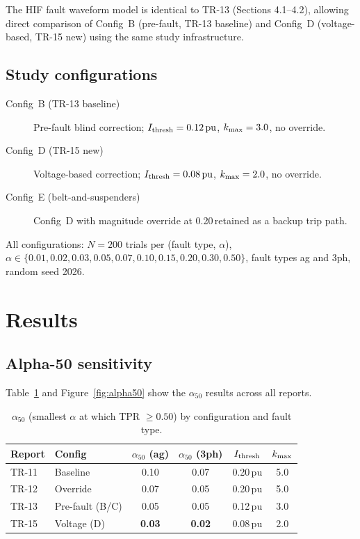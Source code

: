 \documentclass[11pt,a4paper]{article}
\newcommand{\alphafifty}{\alpha_{50}}
\newcommand{\pu}{\,\text{pu}}
\begin{document}
The HIF fault waveform model is identical to TR-13 (Sections 4.1--4.2),
allowing direct comparison of Config~B (pre-fault, TR-13 baseline) and
Config~D (voltage-based, TR-15 new) using the same study infrastructure.

\subsection{Study configurations}

\begin{description}
  \item[Config~B (TR-13 baseline)] Pre-fault blind correction;
        $I_{\rm thresh} = 0.12\pu$, $k_{\rm max} = 3.0$, no override.

  \item[Config~D (TR-15 new)] Voltage-based correction;
        $I_{\rm thresh} = 0.08\pu$, $k_{\rm max} = 2.0$, no override.

  \item[Config~E (belt-and-suspenders)] Config~D with magnitude override
        at 0.20\pu retained as a backup trip path.
\end{description}

All configurations: $N = 200$ trials per (fault type, $\alpha$),
$\alpha \in \{0.01, 0.02, 0.03, 0.05, 0.07, 0.10, 0.15, 0.20, 0.30, 0.50\}$,
fault types ag and 3ph, random seed 2026.

\section{Results}
\label{sec:results}

\subsection{Alpha-50 sensitivity}

Table~\ref{tab:alpha50} and Figure~\ref{fig:alpha50} show the
$\alphafifty$ results across all reports.

\begin{table}[h]
  \centering
  \caption{$\alphafifty$ (smallest $\alpha$ at which TPR $\geq 0.50$) by
           configuration and fault type.}
  \label{tab:alpha50}
  \begin{tabular}{llcccc}
    \toprule
    Report & Config & $\alphafifty$ (ag) & $\alphafifty$ (3ph)
           & $I_{\rm thresh}$ & $k_{\rm max}$ \\
    \midrule
    TR-11 & Baseline          & 0.10 & 0.07 & 0.20\,pu & 5.0 \\
    TR-12 & Override          & 0.07 & 0.05 & 0.20\,pu & 5.0 \\
    TR-13 & Pre-fault (B/C)   & 0.05 & 0.05 & 0.12\,pu & 3.0 \\
    TR-15 & Voltage (D)       & \textbf{0.03} & \textbf{0.02}
                              & 0.08\,pu & 2.0 \\
    \bottomrule
  \end{tabular}
\end{table}
\end{document}
